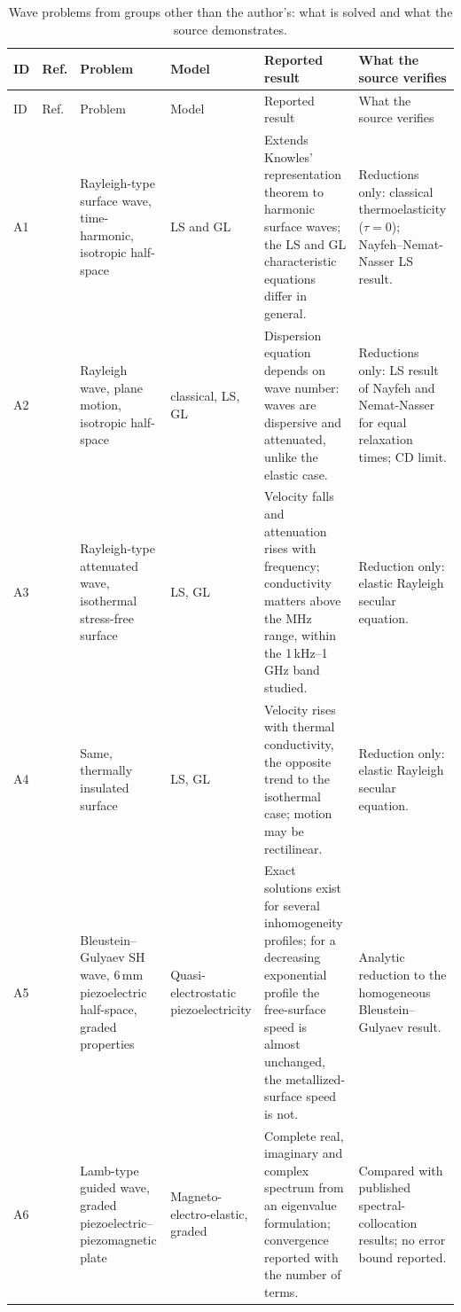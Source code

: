 {\footnotesize
\begin{longtable}{>{\raggedright\arraybackslash}p{0.8cm}>{\raggedright\arraybackslash}p{1.7cm}>{\raggedright\arraybackslash}p{2.6cm}>{\raggedright\arraybackslash}p{2.1cm}>{\raggedright\arraybackslash}p{3.4cm}>{\raggedright\arraybackslash}p{2.7cm}}
\caption{Wave problems from groups other than the author's: what is solved and what the source demonstrates.}\label{tab:atlas}\\
\toprule
ID & Ref. & Problem & Model & Reported result & What the source verifies \\
\midrule
\endfirsthead
\toprule
ID & Ref. & Problem & Model & Reported result & What the source verifies \\
\midrule
\endhead
\bottomrule
\endfoot
A1 & \citet{Agarwal1978} & Rayleigh-type surface wave, time-harmonic, isotropic half-space & LS and GL & Extends Knowles' representation theorem to harmonic surface waves; the LS and GL characteristic equations differ in general. & Reductions only: classical thermoelasticity ($\tau=0$); Nayfeh--Nemat-Nasser LS result. \\
A2 & \citet{AbdAlla2001} & Rayleigh wave, plane motion, isotropic half-space & classical, LS, GL & Dispersion equation depends on wave number: waves are dispersive and attenuated, unlike the elastic case. & Reductions only: LS result of Nayfeh and Nemat-Nasser for equal relaxation times; CD limit. \\
A3 & \citet{Sharma2014} & Rayleigh-type attenuated wave, isothermal stress-free surface & LS, GL & Velocity falls and attenuation rises with frequency; conductivity matters above the MHz range, within the 1\,kHz--1\,GHz band studied. & Reduction only: elastic Rayleigh secular equation. \\
A4 & \citet{Sharma2014} & Same, thermally insulated surface & LS, GL & Velocity rises with thermal conductivity, the opposite trend to the isothermal case; motion may be rectilinear. & Reduction only: elastic Rayleigh secular equation. \\
A5 & \citet{Collet2006} & Bleustein--Gulyaev SH wave, 6\,mm piezoelectric half-space, graded properties & Quasi-electrostatic piezoelectricity & Exact solutions exist for several inhomogeneity profiles; for a decreasing exponential profile the free-surface speed is almost unchanged, the metallized-surface speed is not. & Analytic reduction to the homogeneous Bleustein--Gulyaev result. \\
A6 & \citet{Zhang2018a} & Lamb-type guided wave, graded piezoelectric--piezomagnetic plate & Magneto-electro-elastic, graded & Complete real, imaginary and complex spectrum from an eigenvalue formulation; convergence reported with the number of terms. & Compared with published spectral-collocation results; no error bound reported. \\

\end{longtable}}
